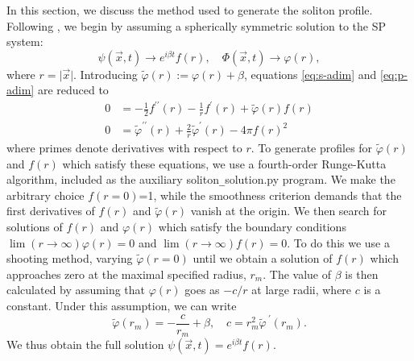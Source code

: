 \documentclass[a4paper,11pt]{article}
\begin{document}


In this section, we discuss the method used to generate the soliton profile. Following \cite{Paredes2016}, we begin by assuming a spherically symmetric solution to the SP system:
\begin{equation}
    \psi(\vec{x},t)\rightarrow e^{i\beta t} f(r), \quad \Phi(\vec{x},t)\rightarrow \varphi(r),
\end{equation}
where $r=\vert\vec{x}\vert$. Introducing $\tilde{\varphi}(r):=\varphi(r)+\beta$, equations \ref{eq:s-adim} and \ref{eq:p-adim} are reduced to
\begin{align}
    0 &= -\frac{1}{2}f^{\prime\prime}(r)-\frac{1}{r}f^\prime(r)+\tilde{\varphi}(r)f(r)\label{eq:s-spherical}\\
    0 &= \tilde{\varphi}^{\prime\prime}(r)+\frac{2}{r}\tilde{\varphi}^\prime(r)-4\pi f(r)^2\label{eq:p-spherical}
\end{align}
where primes denote derivatives with respect to $r$. To generate profiles for $\tilde{\varphi}(r)$ and $f(r)$ which satisfy these equations, we use a fourth-order Runge-Kutta algorithm, included as the auxiliary soliton\texttt{\_}solution.py program. We make the arbitrary choice $f(r=0)$=1, while the smoothness criterion demands that the first derivatives of $f(r)$ and $\tilde{\varphi}(r)$ vanish at the origin. We then search for solutions of $f(r)$ and $\varphi(r)$ which satisfy the boundary conditions $\operatorname{lim}(r\rightarrow\infty)\varphi(r)=0$ and $\operatorname{lim}(r\rightarrow\infty)f(r)=0$. To do this we use a shooting method, varying $\tilde{\varphi}(r=0)$ until we obtain a solution of $f(r)$ which approaches zero at the maximal specified radius, $r_m$. The value of $\beta$ is then calculated by assuming that $\varphi(r)$ goes as $-c/r$ at large radii, where $c$ is a constant. Under this assumption, we can write
\begin{equation}
    \tilde{\varphi}(r_m)=-\frac{c}{r_m}+\beta, \quad c=r_m^2\tilde{\varphi}^{\ \prime}(r_m).
\end{equation}
We thus obtain the full solution $\psi(\vec{x},t)=e^{i\beta t}f(r)$.
\end{document}
